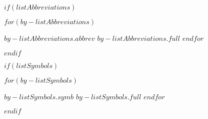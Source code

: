 \frontmatter

\buildFrontPages

$if(listAbbreviations)$
\begin{listAbbreviations}
$for(by-listAbbreviations)$
  \item[$by-listAbbreviations.abbrev$] $by-listAbbreviations.full$
$endfor$
\end{listAbbreviations}
$endif$


$if(listSymbols)$
\begin{listSymbols}
$for(by-listSymbols)$
  \item[$by-listSymbols.symb$] $by-listSymbols.full$
$endfor$
\end{listSymbols}
$endif$

\mainmatter
